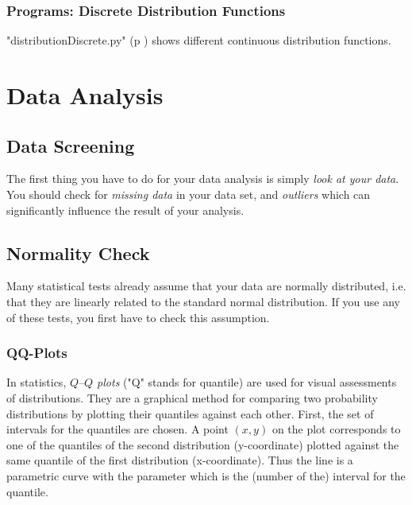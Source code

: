 \subsubsection{Programs: Discrete Distribution Functions} 

\PyImg "distributionDiscrete.py" (p \pageref{py:discrete}) shows different continuous distribution functions.

\section{Data Analysis}

\subsection{Data Screening}

The first thing you have to do for your data analysis is simply \emph{look at your data}. You should check for \emph{missing data} in your data set, and \emph{outliers} which can significantly influence the result of your analysis.

\subsection{Normality Check} 

Many statistical tests already assume that your data are normally
distributed, i.e. that they are linearly related to the standard normal
distribution. If you use any of these tests, you first have to check this assumption.

\subsubsection{QQ-Plots}

 In statistics, \emph{$Q–Q$ plots} ("Q" stands for quantile) are used for visual assessments of distributions. They are a graphical method for comparing two probability distributions by plotting their quantiles against each other. First, the set of intervals for the quantiles are chosen. A point $(x,y)$ on the plot corresponds to one of the quantiles of the second distribution (y-coordinate) plotted against the same quantile of the first distribution (x-coordinate). Thus the line is a parametric curve with the parameter which is the (number of the) interval for the quantile.

